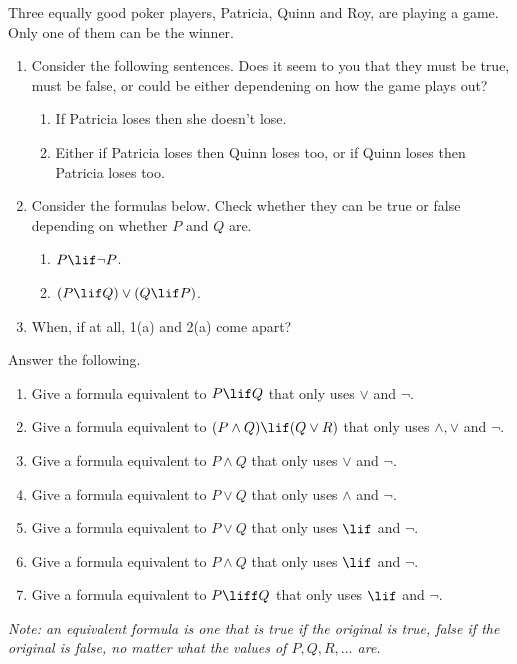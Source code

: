 \documentclass[../../../include/open-logic-section]{subfiles}
\begin{document}
\begin{prob}
Three\emph{ }equally good poker players, Patricia, Quinn and Roy,
are playing a game. Only one of them can be the winner.

\begin{enumerate}
\item Consider the following sentences. Does it seem to you that they must
be true, must be false, or could be either dependening on how the
game plays out?
\begin{enumerate}
\item If Patricia loses then she doesn't lose.
\item Either if Patricia loses then Quinn loses too, or if Quinn loses then
Patricia loses too. 
\end{enumerate}
\item Consider the formulas below. Check whether they can be true or false
depending on whether $P$ and $Q$ are.
\begin{enumerate}
\item $P\lif\lnot P$.
\item $(P\lif Q)\lor(Q\lif P)$.
\end{enumerate}
\item When, if at all, 1(a) and 2(a) come apart?
\end{enumerate}
\end{prob}

\begin{prob}
Answer the following.
\begin{enumerate}
\item  Give a formula equivalent to $P\lif Q$ that only uses $\lor$
and $\lnot$.
\item Give a formula equivalent to $(P\land Q)\lif(Q\lor R)$ that
only uses $\land,\lor$ and $\lnot$.
\item Give a formula equivalent to $P\land Q$ that only uses $\lor$ and
$\lnot$.
\item Give a formula equivalent to $P\lor Q$ that only uses $\land$ and
$\lnot$.
\item Give a formula equivalent to $P\lor Q$ that only uses $\lif$
and $\lnot$.
\item Give a formula equivalent to $P\land Q$ that only uses $\lif$
and $\lnot$.
\item Give a formula equivalent to $P\liff Q$ that only uses
$\lif$ and $\lnot$.
\end{enumerate}

\emph{Note: an equivalent formula is one that is true if the original
is true, false if the original is false, no matter what the values
of $P,Q,R,\ldots$ are.}
\end{prob}
\end{document}
